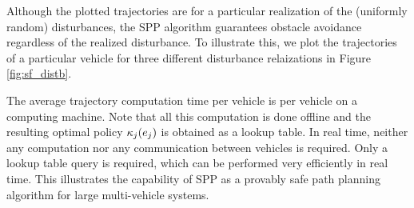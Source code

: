 Although the plotted trajectories are for a particular realization of the (uniformly random) disturbances, the SPP algorithm guarantees obstacle avoidance regardless of the realized disturbance. To illustrate this, we plot the trajectories of a particular vehicle for three different disturbance relaizations in Figure \ref{fig:sf_distb}. 

The average trajectory computation time per vehicle is  per vehicle on a  computing machine. Note that all this computation is done offline and the resulting optimal policy $\kappa_j(e_j)$ is obtained as a lookup table. In real time, neither any computation nor any communication between vehicles is required. Only a lookup table query is required, which can be performed very efficiently in real time. This illustrates the capability of SPP as a provably safe path planning algorithm for large multi-vehicle systems.